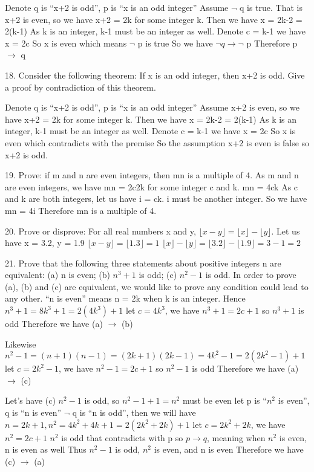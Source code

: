 \documentclass{article}
\begin{document}
Denote q is ``x+2 is odd'', p is ``x is an odd integer''
Assume $\lnot$ q is true. That is x+2 is even, so we have x+2 = 2k for some integer k.
Then we have x = 2k-2 = 2(k-1)
As k is an integer, k-1 must be an integer as well. Denote c = k-1 we have x = 2c
So x is even which means $\lnot$ p is true
So we have $\lnot q \to \lnot$ p
Therefore p $\to$ q

18. Consider the following theorem: If x is an odd integer, then x+2 is odd. Give a proof by contradiction of this theorem.

Denote q is ``x+2 is odd'', p is ``x is an odd integer''
Assume x+2 is even, so we have x+2 = 2k for some integer k.
Then we have x = 2k-2 = 2(k-1)
As k is an integer, k-1 must be an integer as well. Denote c = k-1 we have x = 2c
So x is even which contradicts with the premise
So the assumption x+2 is even is false so x+2 is odd.

19. Prove: if m and n are even integers, then mn is a multiple of 4.
As m and n are even integers, we have mn = 2c2k for some integer c and k.
mn = 4ck
As c and k are both integers, let us have i = ck. i must be another integer.
So we have mn = 4i
Therefore mn is a multiple of 4.

20. Prove or disprove: For all real numbers x and y, $\lfloor x-y\rfloor =\lfloor x \rfloor -\lfloor y \rfloor$.
Let us have x = 3.2, y = 1.9
$\lfloor x-y\rfloor = \lfloor 1.3 \rfloor = 1$
$\lfloor x \rfloor - \lfloor y \rfloor = \lfloor 3.2 \rfloor - \lfloor 1.9 \rfloor = 3 - 1 = 2$

21. Prove that the following three statements about positive integers n are equivalent: (a) n is even; (b) $n^3+1$ is odd; (c) $n^2-1$ is odd.
In order to prove (a), (b) and (c) are equivalent, we would like to prove any condition could lead to any other.
``n is even'' means n = 2k when k is an integer.
Hence $n^3 + 1 = 8k^3 + 1 = 2(4k^3) + 1$
let $c = 4k^3$, we have $n^3 + 1 = 2c + 1$
so $n^3 + 1$ is odd
Therefore we have (a) $\to$ (b)

Likewise $n^2-1 = (n+1)(n-1) = (2k+1)(2k-1) = 4k^2 - 1 = 2(2k^2-1) + 1$
let $c = 2k^2-1$, we have $n^2-1 = 2c + 1$
so $n^2-1$ is odd
Therefore we have (a) $\to$ (c)

Let's have (c) $n^2-1$ is odd, so $n^2 - 1 + 1 = n^2$ must be even
let p is ``$n^2$ is even'', q is ``n is even''
$\lnot$ q is ``n is odd'', then we will have $n = 2k+1, n^2 = 4k^2 + 4k + 1 = 2(2k^2 + 2k) + 1$
let $c = 2k^2 + 2k$, we have $n^2 = 2c + 1$
$n^2$ is odd that contradicts with p
so $p\to q$, meaning when $n^2$ is even, n is even as well
Thus $n^2-1$ is odd, $n^2$ is even, and n is even
Therefore we have (c) $\to$ (a)
\end{document}
